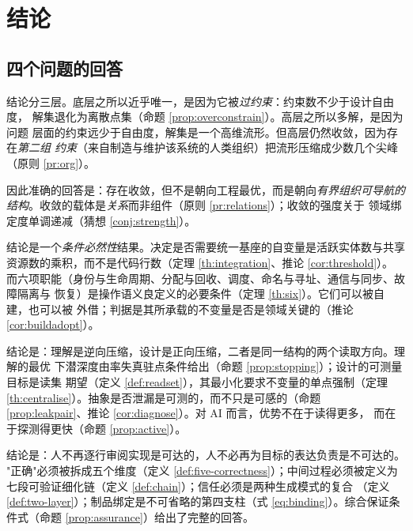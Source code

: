 \chapter{结论}\label{ch:conclusion}

\section{四个问题的回答}

\begin{problem}[底层确定性的可推广性]
结论分三层。底层之所以近乎唯一，是因为它被\emph{过约束}：约束数不少于设计自由度，
解集退化为离散点集（命题 \ref{prop:overconstrain}）。高层之所以多解，是因为问题
层面的约束远少于自由度，解集是一个高维流形。但高层仍然收敛，因为存在\emph{第二组
约束}（来自制造与维护该系统的人类组织）把流形压缩成少数几个尖峰
（原则 \ref{pr:org}）。

因此准确的回答是：存在收敛，但不是朝向工程最优，而是朝向\emph{有界组织可导航的
结构}。收敛的载体是\emph{关系}而非组件（原则 \ref{pr:relations}）；收敛的强度关于
领域绑定度单调递减（猜想 \ref{conj:strength}）。
\end{problem}

\begin{problem}[规模的强制性]
结论是一个\emph{条件必然性}结果。决定是否需要统一基座的自变量是活跃实体数与共享
资源数的乘积，而不是代码行数（定理 \ref{th:integration}、推论 \ref{cor:threshold}）。
而六项职能（身份与生命周期、分配与回收、调度、命名与寻址、通信与同步、故障隔离与
恢复）是操作语义良定义的必要条件（定理 \ref{th:six}）。它们可以被自建，也可以被
外借；判据是其所承载的不变量是否是领域关键的（推论 \ref{cor:buildadopt}）。
\end{problem}

\begin{problem}[智能的理解与设计]
结论是：理解是逆向压缩，设计是正向压缩，二者是同一结构的两个读取方向。理解的最优
下潜深度由率失真驻点条件给出（命题 \ref{prop:stopping}）；设计的可测量目标是读集
期望（定义 \ref{def:readset}），其最小化要求不变量的单点强制（定理
\ref{th:centralise}）。抽象是否泄漏是可测的，而不只是可感的（命题
\ref{prop:leakpair}、推论 \ref{cor:diagnose}）。对 AI 而言，优势不在于读得更多，
而在于探测得更快（命题 \ref{prop:active}）。
\end{problem}

\begin{problem}[无人审阅条件下的正确性]
结论是：人不再逐行审阅实现是可达的，人不必再为目标的表达负责是不可达的。
"正确"必须被拆成五个维度（定义 \ref{def:five-correctness}）；中间过程必须被定义为
七段可验证细化链（定义 \ref{def:chain}）；信任必须是两种生成模式的复合
（定义 \ref{def:two-layer}）；制品绑定是不可省略的第四支柱（式
\eqref{eq:binding}）。综合保证条件式（命题 \ref{prop:assurance}）给出了完整的回答。
\end{problem}

